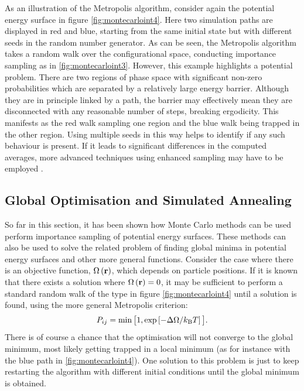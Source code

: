 As an illustration of the Metropolis algorithm, consider again the \td{} potential energy surface in figure \ref{fig:montecarloint4}.
Here two simulation paths are displayed in red and blue, starting from the same initial state but with different %
seeds in the random number generator.
As can be seen, the Metropolis algorithm takes a random walk over the configurational space, conducting importance sampling as in \ref{fig:montecarloint3}.
However, this example highlights a potential problem.
There are two regions of phase space with significant non\--zero probabilities which are separated by a relatively large energy barrier.
Although they are in principle linked by a path, the barrier may effectively mean they are disconnected with any reasonable number of steps, breaking ergodicity.
This manifests as the red walk sampling one region and the blue walk being trapped in the other region.
Using multiple seeds in this way helps to identify if any such behaviour is present.
If it leads to significant differences in the computed averages, more advanced techniques using enhanced sampling may have to be employed \cite{Torrie1977,Earl2005}.

\subsection{Global Optimisation and Simulated Annealing}
\label{s:simulatedannealing}

So far in this section, it has been shown how Monte Carlo methods can be used perform importance sampling of potential energy surfaces.
These methods can also be used to solve the related problem of finding global minima in potential energy surfaces and other more general functions.
Consider the case where there is an objective function, $\Omega\left(\mathbf{r}\right)$, which depends on particle positions.
If it is known that there exists a solution where $\Omega\left(\mathbf{r}\right)=0$, it may be sufficient to perform a standard random walk of the type in figure \ref{fig:montecarloint4} until a solution is found, using the more general Metropolis criterion:
\begin{equation}
	\label{eq:objmetropolis}
	P_{ij} = \min\big[1,\exp\left[-\Delta\Omega/k_\text{B} T\right]\big].
\end{equation}
There is of course a chance that the optimisation will not converge to the global minimum, most likely getting trapped in a local minimum (as for instance with the blue path in \ref{fig:montecarloint4}).
One solution to this problem is just to keep restarting the algorithm with different initial conditions until the global minimum is obtained.

